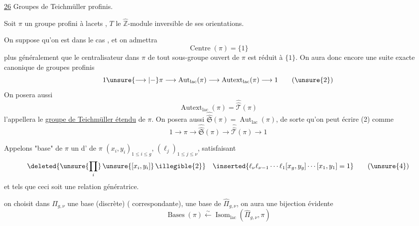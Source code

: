 

\uline{26} Groupes de Teichmüller profinis.


Soit $\pi$ un groupe profini à lacets , $T$ le $\widehat{\mathbb Z}$-module inversible de ses orientations.

On suppose qu'on est dans le cas , et on admettra 
\[
\operatorname{Centre}(\pi)=\{1\}
\tag{1}
\]
plus généralement que le centralisateur dans $\pi$ de tout sous-groupe ouvert de $\pi$ est réduit à $\{1\}$. On aura donc encore une suite exacte canonique de groupes profinis
\[
1 \unsure{\longrightarrow|{-}} \pi \longrightarrow \operatorname{Aut}_{\mathrm{lac}}(\pi) \longrightarrow \operatorname{Autext}_{\mathrm{lac}}(\pi) \longrightarrow 1
\tag{\unsure{2}}
\]
On posera aussi 
\[
\operatorname{Autext}_{\mathrm{lac}}(\pi)=\widehat{\widehat{\mathcal T}}(\pi)
\tag{3}
\]
 l'appellera le \uline{groupe de Teichmüller étendu} de $\pi$. On posera aussi $\widehat{\widehat{\mathfrak S}}(\pi)=\operatorname{Aut}_{\mathrm{lac}}(\pi)$, de sorte qu'on peut écrire (2) comme
\[
1 \longrightarrow \pi \longrightarrow \widehat{\widehat{\mathfrak S}}(\pi) \longrightarrow \widehat{\widehat{\mathcal T}}(\pi) \longrightarrow 1
\tag{2'}
\]

Appelons "base" de $\pi$ un  d' de $\pi$ $(x_i,y_i)_{1\leq i\leq g}$, $(\ell_j)_{1\leq j\leq\nu}$,  satisfaisant
\[
\deleted{\unsure{\prod_i}\,\unsure{[x_i,y_i]}\,\illegible{2}}
\quad
\inserted{\ell_\nu\ell_{\nu-1}\cdots\ell_1[x_g,y_g]\cdots[x_1,y_1]=1}
\tag{\unsure{4}}
\]
et tels que ceci soit une relation génératrice.




 on choisit dans $\Pi_{g,\nu}$ une base (discrète) ( correspondante),  une base de $\widehat{\Pi}_{g,\nu}$, on aura une bijection évidente
\[
\operatorname{Bases}(\pi) \xleftarrow{\sim} \operatorname{Isom}_{\mathrm{lac}}(\widehat{\Pi}_{g,\nu},\pi)
\tag{5}
\]

